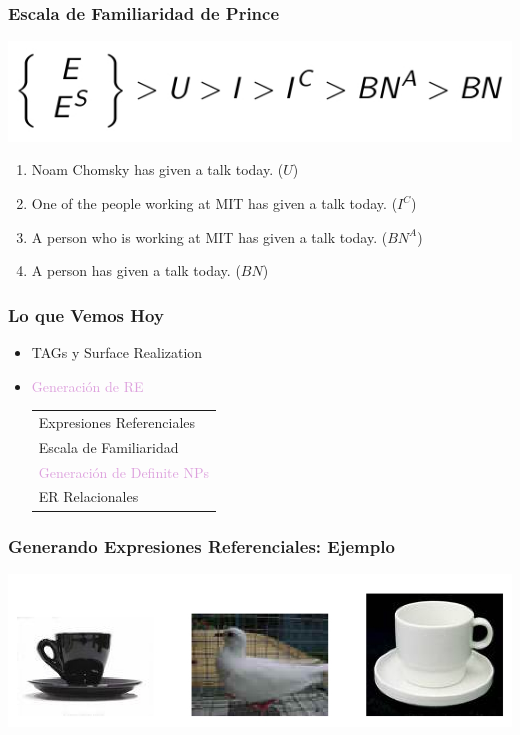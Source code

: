 \documentclass[compress,color=usenames]{beamer}
\newcommand{\mH}[1]{\textcolor{Plum}{#1}}
\begin{document}
\begin{frame}
\frametitle{Escala de Familiaridad de Prince}

\begin{center}
\includegraphics[scale=.4]{pics/pic3-19.jpg}
\end{center}

\begin{enumerate}
\item Noam Chomsky has given a talk today. ($U$)

\item One of the people working at MIT has given a talk today. ($I^C$)

\item A person who is working at MIT has given a talk today.
($BN^A$)

\item A person has given a talk today. ($BN$)
\end{enumerate}

\end{frame}

\begin{frame}
\frametitle{Lo que Vemos Hoy}

\begin{itemize}
\item TAGs y Surface Realization
\item \mH{Generaci\'on de RE}
\begin{tabular}{|l}
Expresiones Referenciales\\
Escala de Familiaridad\\
\mH{Generaci\'on de Definite NPs}\\
ER Relacionales 
\end{tabular}
\end{itemize}
\end{frame}

\begin{frame}
\frametitle{Generando Expresiones Referenciales: Ejemplo}

\begin{center}
\includegraphics[scale=.45]{pics/pic3-20.jpg}
\end{center}

\end{frame}
\end{document}
